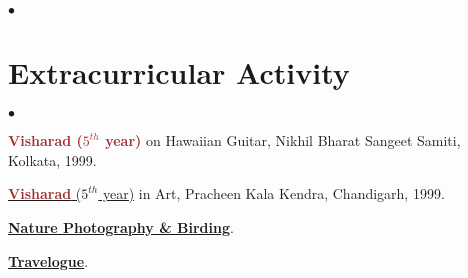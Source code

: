 \documentclass[margin,line]{res}
\newenvironment{list2}{
  \begin{list}{$\bullet$}{%
      \setlength{\itemsep}{0in}
      \setlength{\parsep}{0in} \setlength{\parskip}{0in}
      \setlength{\topsep}{0in} \setlength{\partopsep}{0in} 
      \setlength{\leftmargin}{0.2in}}}{\end{list}}
\begin{document}
\begin{resume}
\begin{list2}
\section{\sc Extracurricular Activity} 
\begin{list2}
\item \textcolor{brown}{\bf Visharad ($5^{th}$ year)} on Hawaiian Guitar, Nikhil Bharat Sangeet Samiti, Kolkata, 1999. 
\item \href{https://amitbny.github.io/akb.github.io/picture/chitrabisharad.pdf}{\textcolor{brown}{\bf Visharad} ($5^{th}$ year)} 
in Art, Pracheen Kala Kendra, Chandigarh, 1999. 
\item \href{https://500px.com/amitbhattacharjee}{\bf Nature Photography \& Birding}. 
\item \href{https://www.tripoto.com/profile/amitbhattacharjee}{\bf Travelogue}. 
\end{list2}

\end{list2}
\end{resume}
\end{document}
